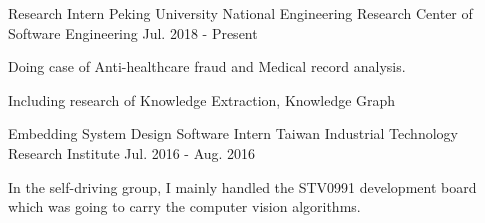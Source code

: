 

\begin{cventries}

  \cventry
    {Research Intern} %
    {Peking University National Engineering Research Center of Software Engineering} %
    {} %
    {Jul. 2018 - Present} %
    {
      \begin{cvitems} %
        \item {Doing case of Anti-healthcare fraud and Medical record analysis.}
        \item {Including research of Knowledge Extraction, Knowledge Graph}
      \end{cvitems}
    }

  \cventry
    {Embedding System Design Software Intern} %
    {Taiwan Industrial Technology Research Institute} %
    {} %
    {Jul. 2016 - Aug. 2016} %
    {
      \begin{cvitems} %
        \item {In the self-driving group, I mainly handled the STV0991 development board which was going to carry the computer vision algorithms.}
      \end{cvitems}
    }

\end{cventries}
